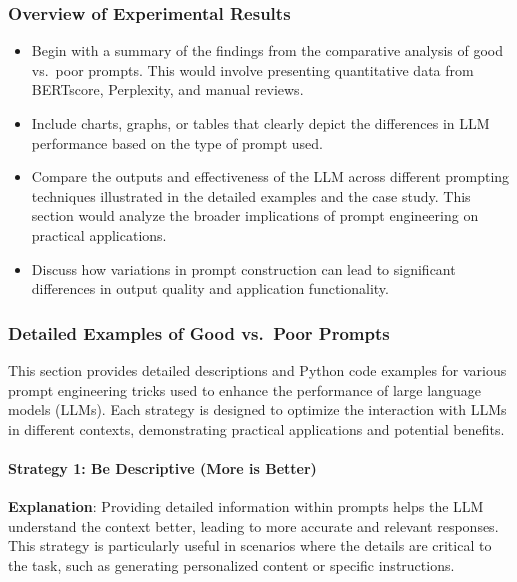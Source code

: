 \documentclass[
]{agujournal2019}
\let\oldparagraph\paragraph
\renewcommand{\paragraph}[1]{\oldparagraph{#1}\mbox{}}
\providecommand{\tightlist}{%
  \setlength{\itemsep}{0pt}\setlength{\parskip}{0pt}}\usepackage{longtable,booktabs,array}
\begin{document}
\subsubsection{Overview of Experimental
Results}\label{overview-of-experimental-results}

\begin{itemize}
\tightlist
\item
  Begin with a summary of the findings from the comparative analysis of
  good vs.~poor prompts. This would involve presenting quantitative data
  from BERTscore, Perplexity, and manual reviews.
\item
  Include charts, graphs, or tables that clearly depict the differences
  in LLM performance based on the type of prompt used.
\item
  Compare the outputs and effectiveness of the LLM across different
  prompting techniques illustrated in the detailed examples and the case
  study. This section would analyze the broader implications of prompt
  engineering on practical applications.
\item
  Discuss how variations in prompt construction can lead to significant
  differences in output quality and application functionality.
\end{itemize}

\subsubsection{Detailed Examples of Good vs.~Poor
Prompts}\label{detailed-examples-of-good-vs.-poor-prompts}

This section provides detailed descriptions and Python code examples for
various prompt engineering tricks used to enhance the performance of
large language models (LLMs). Each strategy is designed to optimize the
interaction with LLMs in different contexts, demonstrating practical
applications and potential benefits.

\paragraph{Strategy 1: Be Descriptive (More is
Better)}\label{strategy-1-be-descriptive-more-is-better}

\textbf{Explanation}: Providing detailed information within prompts
helps the LLM understand the context better, leading to more accurate
and relevant responses. This strategy is particularly useful in
scenarios where the details are critical to the task, such as generating
personalized content or specific instructions.
\end{document}
